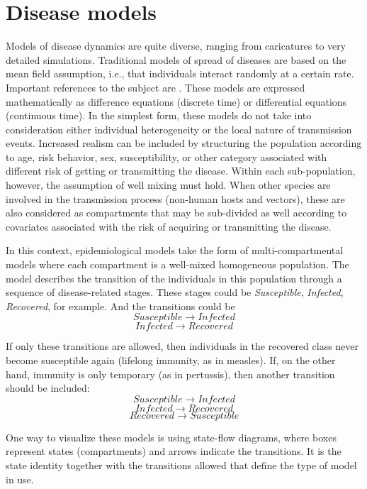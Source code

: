 \section{Disease models}

Models of disease dynamics are quite diverse, ranging from caricatures to very detailed simulations. Traditional models of spread of diseases are based on the mean field assumption, i.e., that individuals interact randomly at a certain rate. Important references to the subject are \cite{DiekmannOandHeesterbeekJAP2000,DaleyDJandGaniJandCanningsC2001,IshamVandMedleyG1996,AndersonRMandMayRMandAndersonB1992}. These models are expressed mathematically as difference equations (discrete time) or differential equations (continuous time). In the simplest form, these models do not take into consideration either individual heterogeneity or the local nature of transmission events. Increased realism can be included by structuring the population according to age, risk behavior, sex, susceptibility, or other category associated with different risk of getting or transmitting the disease. Within each sub-population, however, the assumption of well mixing must hold. When other species are involved in the transmission process (non-human hosts and vectors), these are also considered as compartments that may be sub-divided as well according to covariates associated with the risk of acquiring or transmitting the disease. 

In this context, epidemiological models take the form of multi-compartmental models where each compartment is a well-mixed homogeneous population. The model describes the transition of the individuals in this population through a sequence of disease-related stages. These stages could be \textit{Susceptible}, \textit{Infected}, \textit{Recovered}, for example. And the transitions could be
$$Susceptible \longrightarrow Infected$$
$$Infected \longrightarrow Recovered$$

If only these transitions are allowed, then individuals in the recovered class never become susceptible again (lifelong immunity, as in measles). If, on the other hand, immunity is only temporary (as in pertussis), then another transition should be included:
$$Susceptible \longrightarrow Infected$$
$$Infected \longrightarrow Recovered$$
$$Recovered \longrightarrow Susceptible$$

One way to visualize these models is using state-flow diagrams, where boxes represent states (compartments) and arrows indicate the transitions. It is the state identity together with the transitions allowed that define the type of model in use.

